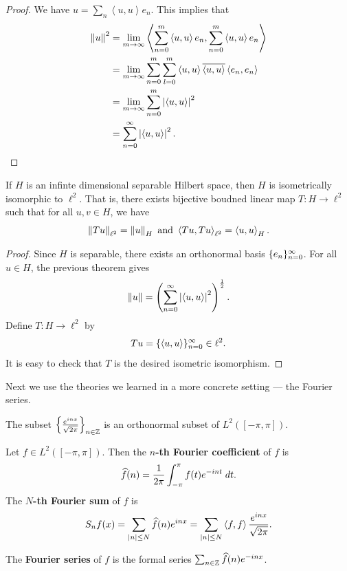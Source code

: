 \documentclass[a4paper]{article}
\renewcommand{\braket}[2]{\left\langle #1, #1 \right\rangle}
\begin{document}
\begin{proof}
We have $u = \sum_n \braket{u}{e_n} e_n$. This implies that 
\[
\begin{aligned}
\norm{u}^2 
&= \lim_{m \to \infty} \braket{\sum_{n=0}^m \braket{u}{e_n}
e_n}{\sum_{l=0}^m \braket{u}{e_l} e_l} \\
&= \lim_{m \to \infty} \sum_{n=0}^m \sum_{l=0}^m 
\braket{u}{e_n} \bar{\braket{u}{e_l}} \braket{e_n}{e_l} \\
&= \lim_{m \to \infty} \sum_{n=0}^m \abs{\braket{u}{e_n}}^2 \\
&= \suminfn \abs{\braket{u}{e_n}}^2.
\end{aligned}
\]
\end{proof}

\begin{thm}
If $H$ is an infinte dimensional separable Hilbert space, 
then $H$ is isometrically isomorphic to $\ell^2$. 
That is, there exists bijective boudned linear map 
$T : H \to \ell^2$ such that 
for all $u, v \in H$, we have 
\[
\norm{T u}_{\ell^2} = \norm{u}_H
\text{ and }
\braket{T u}{T v}_{\ell^2} = \braket{u}{v}_H.
\]
\end{thm}

\begin{proof}
Since $H$ is separable, there exists an orthonormal basis
$\{ e_n \}_{n=0}^\infty$.
For all $u \in H$, the previous theorem gives
\[
\norm{u} = \left( \suminfn \abs{\braket{u}{e_n}}^2 \right)^{\frac{1}{2}}.
\]
Define $T : H \to \ell^2$ by 
\[
T u = \seqinfn{\braket{u}{e_n}} \in \ell^2.
\]
It is easy to check that $T$ is the desired isometric 
isomorphism.
\end{proof}

Next we use the theories we learned in a more concrete 
setting --- the Fourier series.

\begin{thm}
The subset $\left\{ \frac{e^{i n x}}{\sqrt{2 \pi}} \right\}_{n \in \mathbb{Z}}$
is an orthonormal subset of $L^2([-\pi, \pi])$.
\end{thm}

\begin{defi}
Let $f \in L^2([- \pi, \pi])$. Then the \textbf{$n$-th 
Fourier coefficient} of $f$ is 
\[
\widehat{f}(n) = \frac{1}{2\pi} \int_{-\pi}^\pi f(t) 
e^{- i n t} \; d t.
\]
The \textbf{$N$-th Fourier sum} of $f$ is 
\[
S_n f(x) = \sum_{\abs{n} \leq N} \hat{f}(n) e^{inx} 
= \sum_{\abs{n} \leq N} \braket{f}{\frac{e^{int}}{\sqrt{2\pi}}}
\frac{e^{inx}}{\sqrt{2\pi}}.
\]

The \textbf{Fourier series} of $f$ is the formal 
series $\sum_{n \in \mathbb{Z}} \widehat{f} (n) e^{-inx}$.
\end{defi}
\end{document}
